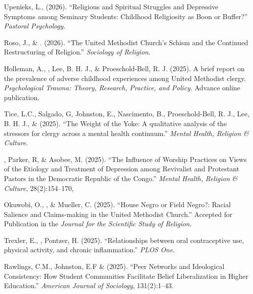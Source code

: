\begin{etaremune}
\item Upenieks, L., \Eagle \hspace{.1em} (2026). ``Religious and Spiritual Struggles and Depressive Symptoms among Seminary Students: Childhood Religiosity as Boon or Buffer?'' \textit{Pastoral Psychology}. 

\item Roso, J., \& \Eagle. (2026). ``The United Methodist Church's Schism and the Continued Restructuring of Religion.'' \textit{Sociology of Religion}. 

\item Holleman, A., \Eagle, Lee, B. H. J., \& Proeschold-Bell, R. J. (2025). A brief report on the prevalence of adverse childhood experiences among United Methodist clergy. \textit{Psychological Trauma: Theory, Research, Practice, and Policy}. Advance online publication. 
	
\item Tice, L.C., Salgado, G, Johnston, E., Nascimento, B., Proeschold-Bell, R. J., Lee, B. H. J., \& \Eagle \hspace{.1em} (2025). ``The Weight of the Yoke: A qualitative analysis of the stressors for clergy across a mental health continuum.'' \textit{Mental Health, Religion \& Culture}. 
 
\item \Eagle, Parker, R, \& Asobee, M. (2025). ``The Inﬂuence of Worship Practices on Views of the Etiology and Treatment of Depression among Revivalist and Protestant Pastors in the Democratic Republic of the Congo.'' \textit{Mental Health, Religion \& Culture}, 28(2):154--170, 

\item Okuwobi, O., \Eagle, \& Mueller, C. (2025). ``House Negro or Field Negro?: Racial Salience and Claims-making in the United Methodist Church.'' Accepted for Publication in the \textit{Journal for the Scientific Study of Religion}. 

\item Trexler, E., \Eagle, Pontzer, H. (2025). ``Relationships between oral contraceptive use, physical activity, and chronic inflammation.''  \textit{PLOS One}. 

\item Rawlings, C.M., Johnston, E.F \& \Eagle \hspace{.1em} (2025). ``Peer Networks and Ideological Consistency: How Student Communities Facilitate Belief Liberalization in Higher Education.'' \textit{American Journal of Sociology}, 131(2):1--43. 


\end{etaremune}
